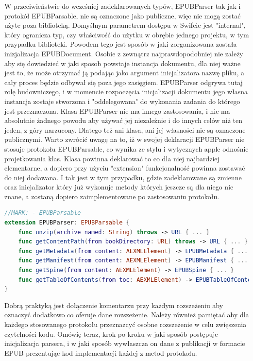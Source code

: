 W przeciwieństwie do wcześniej zadeklarowanych typów, EPUBParser tak jak i protokół EPUBParsable, nie są oznaczone jako publiczne, więc nie mogą zostać użyte poza biblioteką. Domyślnym parametrem dostępu w Swifcie jest "internal", który ogranicza typ, czy właściwość do użytku w obrębie jednego projektu, w tym przypadku biblioteki. Powodem tego jest sposób w jaki zorganizowana została inizjalizacja EPUBDocument. Osobie z zewnątrz najprawdopodobniej nie zależy aby się dowiedzieć w jaki sposob powstaje instancja dokumentu, dla niej ważne jest to, że może otrzymać ją podając jako argument inicjalizatora nazwę pliku, a cały proces będzie odbywał się poza jego zasięgiem. EPUBParser odgrywa tutaj rolę budowniczego, i w momencie rozpoczęcia inicjalizacji dokumentu jego własna instancja zostaje stworzona i "oddelegowana" do wykonania zadania do którego jest przeznaczona. Klasa EPUBParser nie ma innego zastosowania, i nie ma absolutnie żadnego powodu aby używać jej niezależnie i do innych celów niż ten jeden, z góry narzucony. Dlatego też ani klasa, ani jej własności nie są oznaczone publicznymi. Warto zwrócić uwagę na to, iż w swojej deklaracji EPUBParser nie stosuje protokołu EPUBParsable, co wynika ze stylu i wytycznych apple odnośnie projetkowania klas. Klasa powinna deklarować to co dla niej najbardziej elementarne, a dopiero przy użyciu "extension" funkcjonalność powinna zostawać do niej dodawana. I tak jest w tym przypadku, gdzie zadeklarowane są zmienne oraz inicjalizator który już wykonuje metody których jeszcze są dla niego nie znane, a zostaną dopiero zaimplementowane po zastosowaniu protokołu.

\begin{lstlisting}[caption={Klasa EPUBParser stosuje protokół EPUBParsable.}, language=swift]
//MARK: - EPUBParsable
extension EPUBParser: EPUBParsable {
    func unzip(archive named: String) throws -> URL { ... }
    func getContentPath(from bookDirectory: URL) throws -> URL { ... }
    func getMetadata(from content: AEXMLElement) -> EPUBMetadata { ... }
    func getManifest(from content: AEXMLElement) -> EPUBManifest { ... }
    func getSpine(from content: AEXMLElement) -> EPUBSpine { ... }
    func getTableOfContents(from toc: AEXMLElement) -> EPUBTableOfContents { ... }
}
\end{lstlisting}

Dobrą praktyką jest dołączenie komentarzu przy każdym rozszeżeniu aby oznaczyć dodatkowo co oferuje dane rozszeżenie. Należy również pamiętać aby dla każdego stosowanego protokołu przeznazcyć osobne rozszeżenie w celu zwięszenia czytelności kodu. Omówię teraz, krok po kroku w jaki sposób postępuje inicjalizacja parsera, i w jaki sposób wywłaszcza on dane z publikacji w formacie EPUB prezentując kod implementacji każdej z metod protokołu.

